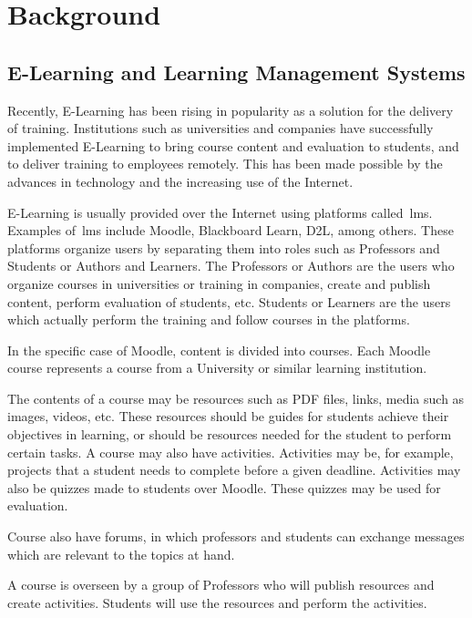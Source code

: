 \chapter{Background}

\section{E-Learning and Learning Management Systems}
\label{sec:elearning_and_lms}

Recently, E-Learning has been rising in popularity as a solution for the
delivery of training. Institutions such as universities and companies have
successfully implemented E-Learning to bring course content and evaluation to
students, and to deliver training to employees remotely. This has been made
possible by the advances in technology and the increasing use of the
Internet.

E-Learning is usually provided over the Internet using platforms
called~\gls{lms}. Examples of~\gls{lms} include Moodle, Blackboard Learn, D2L,
among others. These platforms organize users by separating them into roles such
as Professors and Students or Authors and Learners. The Professors or Authors
are the users who organize courses in universities or training in companies,
create and publish content, perform evaluation of students, etc. Students or
Learners are the users which actually perform the training and follow courses
in the platforms.~\cite{ind_010, ind_011, ind_013}

In the specific case of Moodle, content is divided into courses. Each Moodle
course represents a course from a University or similar learning institution.

The contents of a course may be resources such as PDF files, links, media such
as images, videos, etc. These resources should be guides for students achieve
their objectives in learning, or should be resources needed for the student to
perform certain tasks. A course may also have activities. Activities may be,
for example, projects that a student needs to complete before a given deadline.
Activities may also be quizzes made to students over Moodle. These quizzes may
be used for evaluation.

Course also have forums, in which professors and students can exchange messages
which are relevant to the topics at hand.

A course is overseen by a group of Professors who will publish resources and
create activities. Students will use the resources and perform the
activities.~\cite{ind_014, ind_015}

